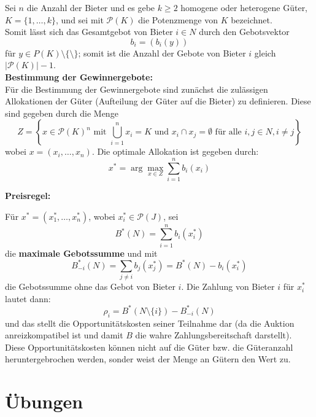 \documentclass[12pt]{extreport} %
\theoremstyle{named}
\theoremstyle{itshape}
\theoremstyle{normal}
\begin{document}
Sei $n$ die Anzahl der Bieter und es gebe $k \geq 2$ homogene oder heterogene Güter, $K = \{ 1, \dotsc, k\}$, und sei mit $\mathcal{P}(K)$ die Potenzmenge von $K$ bezeichnet. ~\\

Somit lässt sich das Gesamtgebot von Bieter $i \in N$ durch den Gebotsvektor
$$ b_{i} = \left( b_{i}(y) \right) $$
für $y \in P(K) \setminus \{ \setminus \}$; somit ist die Anzahl der Gebote von Bieter $i$ gleich $\left| \mathcal{P}(K) \right| - 1$. ~\\


\textbf{Bestimmung der Gewinnergebote:} ~\\

Für die Bestimmung der Gewinnergebote sind zunächst die zulässigen Allokationen der Güter (Aufteilung der Güter auf die Bieter) zu definieren. Diese sind gegeben durch die Menge
$$Z = \left\{ x \in \mathcal{P}(K)^{n} \text{ mit } \bigcup_{i=1}^{n} x_{i} = K \text{ und } x_{i} \cap x_{j} = \emptyset \text{ für alle } i, j \in N, i \neq j \right\}$$
wobei $x = \left( x_{i}, \dotsc, x_{n} \right)$. Die optimale Allokation ist gegeben durch: 
$$x^{*} = \arg \max_{x \in Z } \sum_{i=1}^{n} b_{i}(x_{i}) $$

\textbf{Preisregel:} ~\\ 

Für $x^{*} = \left( x_1^{*}, \dotsc, x_{n}^{*} \right)$, wobei $x_{i}^{*} \in \mathcal{P}(J)$, sei
	$$ B^{*}(N) = \sum_{i=1}^{n} b_{i}(x_{i}^{*}) $$
die \textbf{maximale Gebotssumme} und mit 
	$$ B_{-i}^{*}(N) = \sum_{j \neq i} b_{j}(x_{j}^{*}) = B^{*}(N) - b_{i}(x_{i}^{*}) $$
die Gebotssumme ohne das Gebot von Bieter $i$. Die Zahlung von Bieter $i$ für $x_{i}^{*}$ lautet dann:
$$ \rho_{i} = B^{*}\left(N \setminus \{ i \} \right) - B_{-i}^{*}(N) $$
und das stellt die Opportunitätskosten seiner Teilnahme dar (da die Auktion anreizkompatibel ist und damit $B$ die wahre Zahlungsbereitschaft darstellt). Diese Opportunitätskosten können nicht auf die Güter bzw. die Güteranzahl heruntergebrochen werden, sonder weist der Menge an Gütern den Wert zu.
\newpage

 \appendix {}  

\chapter*{Übungen}
\end{document}
